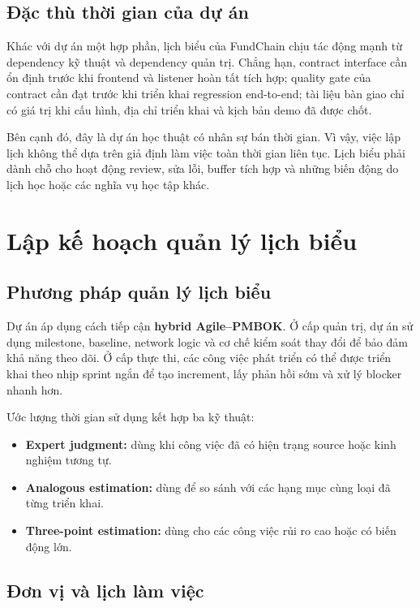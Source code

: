\subsection{Đặc thù thời gian của dự án}

Khác với dự án một hợp phần, lịch biểu của FundChain chịu tác động mạnh từ dependency kỹ thuật và dependency quản trị. Chẳng hạn, contract interface cần ổn định trước khi frontend và listener hoàn tất tích hợp; quality gate của contract cần đạt trước khi triển khai regression end-to-end; tài liệu bàn giao chỉ có giá trị khi cấu hình, địa chỉ triển khai và kịch bản demo đã được chốt.

Bên cạnh đó, đây là dự án học thuật có nhân sự bán thời gian. Vì vậy, việc lập lịch không thể dựa trên giả định làm việc toàn thời gian liên tục. Lịch biểu phải dành chỗ cho hoạt động review, sửa lỗi, buffer tích hợp và những biến động do lịch học hoặc các nghĩa vụ học tập khác.

\fi
\section{Lập kế hoạch quản lý lịch biểu}

\subsection{Phương pháp quản lý lịch biểu}

Dự án áp dụng cách tiếp cận \textbf{hybrid Agile--PMBOK}. Ở cấp quản trị, dự án sử dụng milestone, baseline, network logic và cơ chế kiểm soát thay đổi để bảo đảm khả năng theo dõi. Ở cấp thực thi, các công việc phát triển có thể được triển khai theo nhịp sprint ngắn để tạo increment, lấy phản hồi sớm và xử lý blocker nhanh hơn.

Ước lượng thời gian sử dụng kết hợp ba kỹ thuật:

\begin{itemize}
  \item \textbf{Expert judgment:} dùng khi công việc đã có hiện trạng source hoặc kinh nghiệm tương tự.
  \item \textbf{Analogous estimation:} dùng để so sánh với các hạng mục cùng loại đã từng triển khai.
  \item \textbf{Three-point estimation:} dùng cho các công việc rủi ro cao hoặc có biến động lớn.
\end{itemize}

\subsection{Đơn vị và lịch làm việc}

